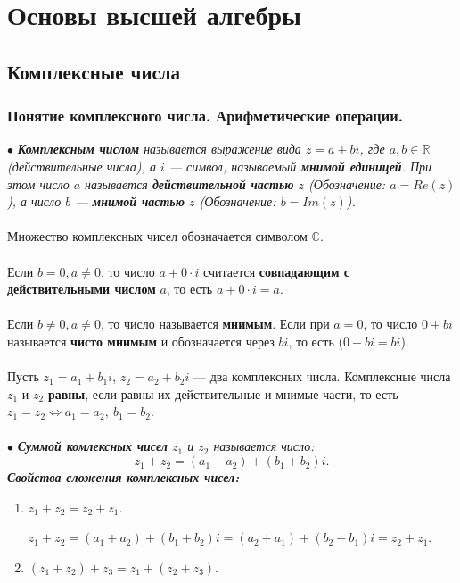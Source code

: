 \part{Основы высшей алгебры}
\chapter{Комплексные числа}
\section{Понятие комплексного числа. Арифметические операции.}
$\bullet$ \textit{\textbf{Комплексным числом} называется выражение вида $z = a+bi$, где $a, b \in \mathbb{R}$ (действительные
	числа), а $i$ --- символ, называемый \textbf{мнимой единицей}. При этом число $a$ называется \textbf{действительной частью} $z$ (Обозначение: $a = Re(z)$), а число $b$ --- \textbf{мнимой частью} $z$ (Обозначение: $b = Im(z)$).}\\\\
Множество комплексных чисел обозначается символом $\mathbb{C}$.\\\\
Если $b=0, a\ne 0$, то число $a + 0\cdot i$ считается \textbf{совпадающим с действительными числом} $a$, то есть $a + 0\cdot i = a$.\\\\
Если $b\ne 0, a\ne 0$, то число называется \textbf{мнимым}. Если при $a = 0$, то число $0+bi$ называется \textbf{чисто мнимым} и обозначается через $bi$, то есть ($0+bi = bi$).\\\\
Пусть $z_1 = a_1 + b_1 i$, $z_2 = a_2 + b_2 i$ --- два комплексных числа. Комплексные числа $z_1$ и $z_2$ \textbf{равны}, если равны их действительные и мнимые части, то есть $z_1 = z_2 \Longleftrightarrow a_1 = a_2,\ b_1 = b_2$.\\\\
$\bullet$ \textit{\textbf{Суммой комлексных чисел} $z_1$ и $z_2$ называется число: $$z_1 + z_2 = (a_1 + a_2) + (b_1 + b_2) i.$$}
\textbf{\textit{Свойства сложения комплексных чисел:}}\begin{enumerate}
	\item $z_1 + z_2 = z_2 + z_1$. \begin{Proof}
		$z_1 + z_2 = (a_1 + a_2) + (b_1 + b_2) i = (a_2 + a_1) + (b_2 + b_1) i = z_2 + z_1$.
	\end{Proof}
	\item $(z_1 + z_2) + z_3 = z_1 + (z_2 + z_3)$.
\end{enumerate}
